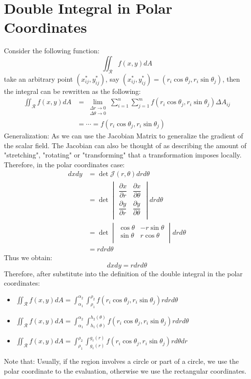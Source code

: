 \documentclass[UTF8,a4paper, 10pt, openany]{book}
\begin{document}
\section{Double Integral in Polar Coordinates}
Consider the following function:
$$\iint_{\mathcal{R}}f(x,y)dA$$
take an arbitrary point $(x_{ij}^*,y_{ij}^*)$, say $(x_{ij}^*,y_{ij}^*)=(r_{i}\cos \theta_{j},r_{i}\sin \theta_{j})$, then the integral can be rewritten as the following:
\begin{align*}
\iint_{\mathcal{R}}f(x,y)dA &= \lim_{\substack{\Delta r\to 0\\ \Delta \theta\to 0}}\displaystyle\sum_{i=1}^{n}\displaystyle\sum_{j=1}^{m}f(r_{i}\cos \theta_{j},r_{i}\sin \theta_{j})\Delta A_{ij}\\
&=\cdots =f(r_{i}\cos \theta_{j},r_{i}\sin \theta_{j})
\end{align*}
Generalization:
As we can use the Jacobian Matrix to generalize the gradient of the scalar field. The Jacobian can also be thought of as describing the amount of "stretching", "rotating" or "transforming" that a transformation imposes locally. \\
Therefore, in the polar coordinates case:
\begin{align*}
dxdy& =\det\mathcal{J}(r,\theta)drd\theta\\
&=\det
\begin{vmatrix}
\dfrac{\partial x}{\partial r} & \dfrac{\partial x}{\partial \theta} \\
\dfrac{\partial y}{\partial r} & \dfrac{\partial y}{\partial \theta} \\
\end{vmatrix}drd\theta\\
&=\det
\begin{vmatrix}
\cos \theta & -r\sin \theta \\
\sin \theta & r\cos \theta \\
\end{vmatrix}drd\theta\\
&=rdrd\theta
\end{align*}
Thus we obtain:
$$dxdy=rdrd\theta$$
Therefore, after substitute into the definition of the double integral in the polar coordinates:
\begin{itemize}
\item $\displaystyle\iint_{\mathcal{R}}f(x,y)dA=\int_{\alpha_{1}}^{\alpha_{2}}\int_{\rho_{1}}^{\rho_{2}}f(r_{i}\cos \theta_{j},r_{i}\sin \theta_{j})rdrd\theta$
\item $\displaystyle\iint_{\mathcal{R}}f(x,y)dA=\int_{\alpha_{1}}^{\alpha_{2}}\int_{h_{1}(\theta)}^{h_{2}(\theta)}f(r_{i}\cos \theta_{j},r_{i}\sin \theta_{j})rdrd\theta$
\item $\displaystyle\iint_{\mathcal{R}}f(x,y)dA=\int_{\rho_{1}}^{\rho_{2}}\int_{g_{1}(r)}^{g_{1}(r)}f(r_{i}\cos \theta_{j},r_{i}\sin \theta_{j})rd\theta dr$
\end{itemize}
Note that: Usually, if the region involves a circle or part of a circle, we use the polar coordinate to the evaluation, otherwise we use the rectangular coordinates.
\end{document}
